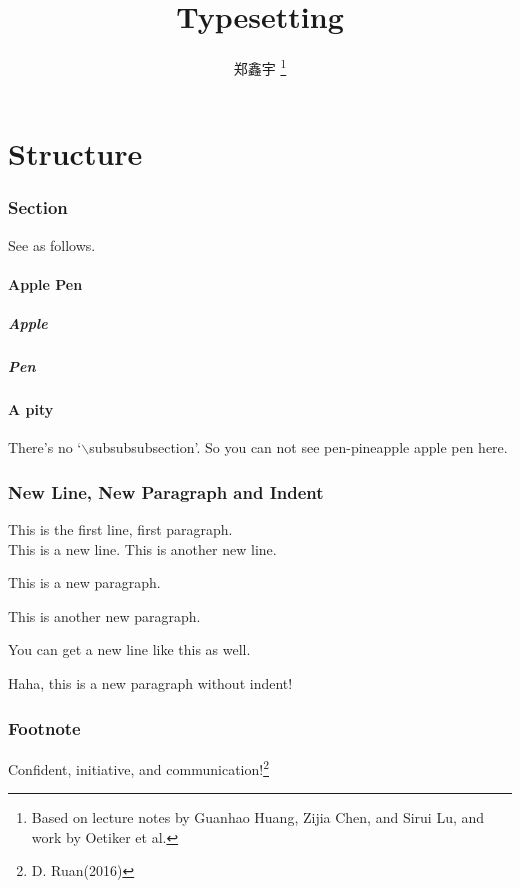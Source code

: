 \documentclass[12pt]{article}
\author{郑鑫宇 \thanks{Based on lecture notes by Guanhao Huang, Zijia Chen, and Sirui Lu, and work by Oetiker et{} al.}}
\title{Typesetting}
\begin{document}
\maketitle
\newpage

\tableofcontents
\newpage

\part{Structure}

\section{Section}
See as follows.
\subsection{Apple Pen}
\subsubsection{Apple}
\subsubsection{Pen}
\subsection*{A pity}
There's no `$\backslash$subsubsubsection'. So you can not see pen-pineapple apple pen here.

\section{New Line, New Paragraph and Indent}
This is the first line, first paragraph.\\
This is a new line.\newline
\indent This is another new line.

This is a new paragraph.\par
This is another new paragraph.

You can get a new line like this as well.

\noindent Haha, this is a new paragraph without indent!

\section{Footnote}
Confident, initiative, and communication!\footnote{D. Ruan(2016)}
\end{document}
